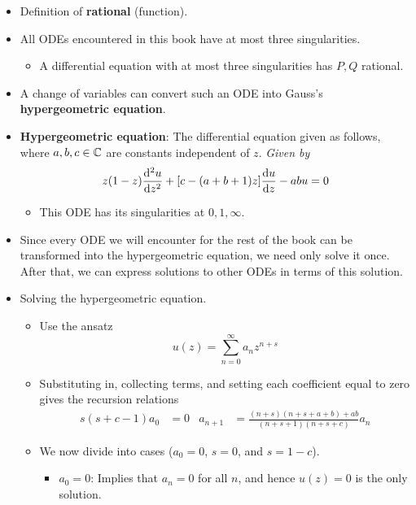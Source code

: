 \documentclass[../finalProject.tex]{subfiles}
\begin{document}
\begin{itemize}
    \item Definition of \textbf{rational} (function).
    \item All ODEs encountered in this book have at most three singularities.
    \begin{itemize}
        \item A differential equation with at most three singularities has $P,Q$ rational.
    \end{itemize}
    \item A change of variables can convert such an ODE into Gauss's \textbf{hypergeometric equation}.
    \item \textbf{Hypergeometric equation}: The differential equation given as follows, where $a,b,c\in\mathbb{C}$ are constants independent of $z$. \emph{Given by}
    \begin{equation*}
        z(1-z)\dv[2]{u}{z}+[c-(a+b+1)z]\dv{u}{z}-abu = 0
    \end{equation*}
    \begin{itemize}
        \item This ODE has its singularities at $0,1,\infty$.
    \end{itemize}
    \item Since every ODE we will encounter for the rest of the book can be transformed into the hypergeometric equation, we need only solve it once. After that, we can express solutions to other ODEs in terms of this solution.
    \item Solving the hypergeometric equation.
    \begin{itemize}
        \item Use the ansatz
        \begin{equation*}
            u(z) = \sum_{n=0}^\infty a_nz^{n+s}
        \end{equation*}
        \item Substituting in, collecting terms, and setting each coefficient equal to zero gives the recursion relations
        \begin{align*}
            s(s+c-1)a_0 &= 0&
            a_{n+1} &= \frac{(n+s)(n+s+a+b)+ab}{(n+s+1)(n+s+c)}a_n
        \end{align*}
        \item We now divide into cases ($a_0=0$, $s=0$, and $s=1-c$).
        \begin{itemize}
            \item \underline{$a_0=0$}: Implies that $a_n=0$ for all $n$, and hence $u(z)=0$ is the only solution.

\end{itemize}
\end{itemize}
\end{itemize}
\end{document}

